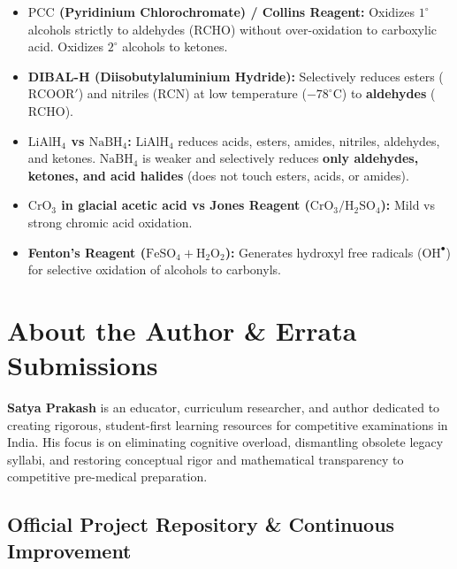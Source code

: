 \documentclass[10pt,twoside,openright]{book}
\begin{document}
\begin{ncertbox}
\begin{itemize}
  \item \textbf{$\mathrm{PCC}$ (Pyridinium Chlorochromate) / Collins Reagent:} Oxidizes $1^\circ$ alcohols strictly to aldehydes ($\mathrm{RCHO}$) without over-oxidation to carboxylic acid. Oxidizes $2^\circ$ alcohols to ketones.
  \item \textbf{DIBAL-H (Diisobutylaluminium Hydride):} Selectively reduces esters ($\mathrm{RCOOR'}$) and nitriles ($\mathrm{RCN}$) at low temperature ($-78^\circ\mathrm{C}$) to \textbf{aldehydes} ($\mathrm{RCHO}$).
  \item \textbf{$\mathrm{LiAlH}_4$ vs $\mathrm{NaBH}_4$:} $\mathrm{LiAlH}_4$ reduces acids, esters, amides, nitriles, aldehydes, and ketones. $\mathrm{NaBH}_4$ is weaker and selectively reduces \textbf{only aldehydes, ketones, and acid halides} (does not touch esters, acids, or amides).
  \item \textbf{$\mathrm{CrO_3}$ in glacial acetic acid vs Jones Reagent ($\mathrm{CrO_3 / H_2SO_4}$):} Mild vs strong chromic acid oxidation.
  \item \textbf{Fenton's Reagent ($\mathrm{FeSO_4 + H_2O_2}$):} Generates hydroxyl free radicals ($\mathrm{OH}^\bullet$) for selective oxidation of alcohols to carbonyls.
\end{itemize}
\end{ncertbox}

\backmatter

\chapter*{About the Author \& Errata Submissions}

\textbf{Satya Prakash} is an educator, curriculum researcher, and author dedicated to creating rigorous, student-first learning resources for competitive examinations in India. His focus is on eliminating cognitive overload, dismantling obsolete legacy syllabi, and restoring conceptual rigor and mathematical transparency to competitive pre-medical preparation.

\section*{Official Project Repository \& Continuous Improvement}
\end{document}
